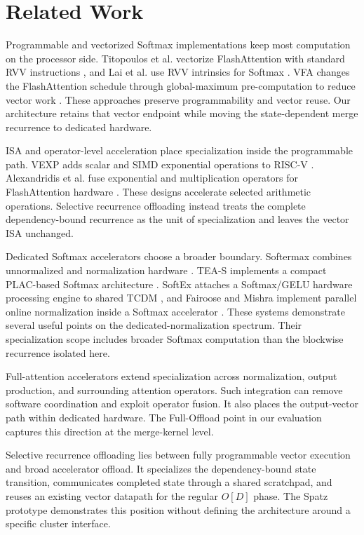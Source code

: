 \documentclass[journal]{IEEEtran}
\begin{document}
\section{Related Work}

Programmable and vectorized Softmax implementations keep most computation on
the processor side. Titopoulos et al. vectorize FlashAttention with standard
RVV instructions \cite{titopoulos2026vectorized}, and Lai et al. use RVV
intrinsics for Softmax \cite{lai2026rvvsoftmax}. VFA changes the
FlashAttention schedule through global-maximum pre-computation to reduce
vector work \cite{sun2026vfa}. These approaches preserve programmability and
vector reuse. Our architecture retains that vector endpoint while moving the
state-dependent merge recurrence to dedicated hardware.

ISA and operator-level acceleration place specialization inside the
programmable path. VEXP adds scalar and SIMD exponential operations to RISC-V
\cite{vexp2025}. Alexandridis et al. fuse exponential and multiplication
operators for FlashAttention hardware \cite{alexandridis2025expmul}. These
designs accelerate selected arithmetic operations. Selective recurrence
offloading instead treats the complete dependency-bound recurrence as the
unit of specialization and leaves the vector ISA unchanged.

Dedicated Softmax accelerators choose a broader boundary. Softermax combines
unnormalized and normalization hardware \cite{softermax2021}. TEA-S implements
a compact PLAC-based Softmax architecture \cite{teas2023}. SoftEx attaches a
Softmax/GELU hardware processing engine to shared TCDM \cite{softex2025}, and
Fairoose and Mishra implement parallel online normalization inside a Softmax
accelerator \cite{fairoose2026parallel}. These systems demonstrate several
useful points on the dedicated-normalization spectrum. Their specialization
scope includes broader Softmax computation than the blockwise recurrence
isolated here.

Full-attention accelerators extend specialization across normalization,
output production, and surrounding attention operators. Such integration can
remove software coordination and exploit operator fusion. It also places the
output-vector path within dedicated hardware. The Full-Offload point in our
evaluation captures this direction at the merge-kernel level.

Selective recurrence offloading lies between fully programmable vector
execution and broad accelerator offload. It specializes the dependency-bound
state transition, communicates completed state through a shared scratchpad,
and reuses an existing vector datapath for the regular $O[D]$ phase. The Spatz
prototype demonstrates this position without defining the architecture around
a specific cluster interface.
\end{document}
